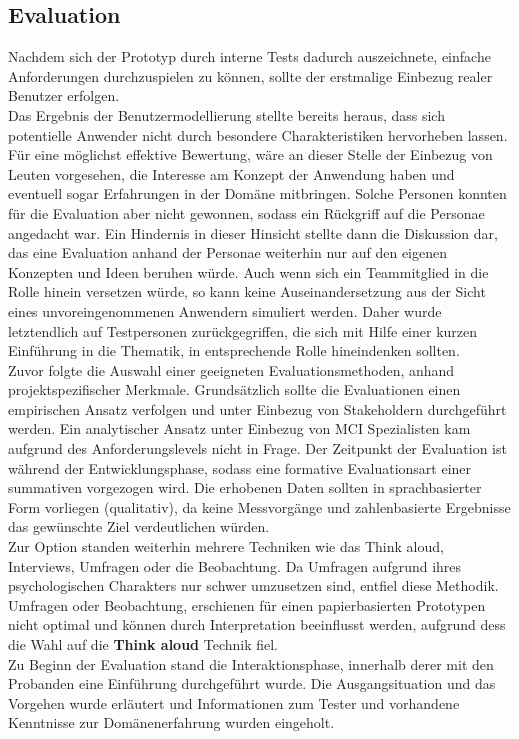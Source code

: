 \subsection{Evaluation}
Nachdem sich der Prototyp durch interne Tests dadurch auszeichnete, einfache Anforderungen durchzuspielen zu können, sollte der erstmalige Einbezug realer Benutzer erfolgen.\\
Das Ergebnis der Benutzermodellierung stellte bereits heraus, dass sich potentielle Anwender nicht durch besondere Charakteristiken hervorheben lassen. Für eine möglichst effektive Bewertung, wäre an dieser Stelle der Einbezug von Leuten vorgesehen, die Interesse am Konzept der Anwendung haben und eventuell sogar Erfahrungen in der Domäne mitbringen. Solche Personen konnten für die Evaluation aber nicht gewonnen, sodass ein Rückgriff auf die Personae angedacht war. Ein Hindernis in dieser Hinsicht stellte dann die Diskussion dar, das eine Evaluation anhand der Personae weiterhin nur auf den eigenen Konzepten und Ideen beruhen würde.
Auch wenn sich ein Teammitglied in die Rolle hinein versetzen würde, so kann keine Auseinandersetzung aus der Sicht eines unvoreingenommenen Anwendern simuliert werden.
Daher wurde letztendlich auf Testpersonen zurückgegriffen, die sich mit Hilfe einer kurzen Einführung in die Thematik, in entsprechende Rolle hineindenken sollten.\\
Zuvor folgte die Auswahl einer geeigneten Evaluationsmethoden, anhand projektspezifischer Merkmale. 
Grundsätzlich sollte die Evaluationen einen empirischen Ansatz verfolgen und unter Einbezug von Stakeholdern durchgeführt werden. Ein analytischer Ansatz unter Einbezug von MCI Spezialisten kam aufgrund des Anforderungslevels nicht in Frage.
Der Zeitpunkt der Evaluation ist während der Entwicklungsphase, sodass eine formative Evaluationsart einer summativen vorgezogen wird. Die erhobenen Daten sollten in sprachbasierter Form vorliegen (qualitativ), da keine Messvorgänge und zahlenbasierte Ergebnisse das gewünschte Ziel verdeutlichen würden.\\
Zur Option standen weiterhin mehrere Techniken wie das Think aloud, Interviews, Umfragen oder die Beobachtung.
Da Umfragen aufgrund ihres psychologischen Charakters nur schwer umzusetzen sind, entfiel diese Methodik. Umfragen oder Beobachtung, erschienen für einen papierbasierten Prototypen nicht optimal und können durch Interpretation beeinflusst werden, aufgrund dess die Wahl auf die \textbf{Think aloud} Technik fiel.\\
Zu Beginn der Evaluation stand die Interaktionsphase, innerhalb derer mit den Probanden eine Einführung durchgeführt wurde. Die Ausgangsituation und das Vorgehen wurde erläutert und Informationen zum Tester und vorhandene Kenntnisse zur Domänenerfahrung wurden eingeholt.\\
